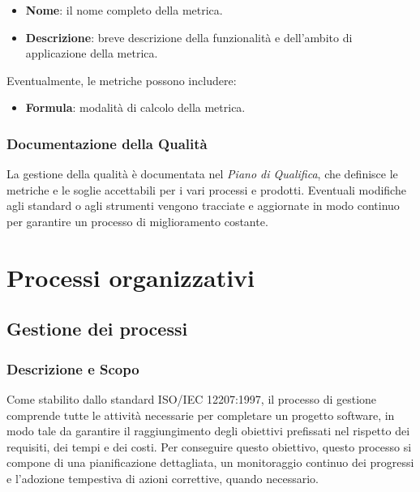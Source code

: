 \documentclass[10pt]{article}
\begin{document}
\begin{justify}
\begin{itemize}
    \item \textbf{Nome}: il nome completo della metrica.
    \item \textbf{Descrizione}: breve descrizione della funzionalità e dell’ambito di applicazione della metrica.
\end{itemize}

Eventualmente, le metriche possono includere:
\begin{itemize}
    \item \textbf{Formula}: modalità di calcolo della metrica.
\end{itemize}
    
    \subsubsection{Documentazione della Qualità}
    La gestione della qualità è documentata nel \textit{Piano di Qualifica}, che definisce le metriche e le soglie accettabili per i vari processi e prodotti. Eventuali modifiche agli standard o agli strumenti vengono tracciate e aggiornate in modo continuo per garantire un processo di miglioramento costante.

\newpage
\section{Processi organizzativi}
    \subsection{Gestione dei processi}

    \subsubsection{Descrizione e Scopo}
    Come stabilito dallo standard ISO/IEC 12207:1997, il processo di gestione comprende tutte le attività necessarie per completare un progetto software, in modo tale da garantire il raggiungimento degli obiettivi prefissati nel rispetto dei requisiti, dei tempi e dei costi. Per conseguire questo obiettivo, questo processo si compone di una pianificazione dettagliata, un monitoraggio continuo dei progressi e l'adozione tempestiva di azioni correttive, quando necessario.


\end{justify}
\end{document}

